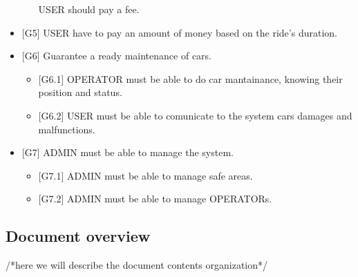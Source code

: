 \begin{itemize}
\begin{itemize}
USER should pay a fee.
\end{itemize}
\item {[}G5{]} USER have to pay an amount of money based on the ride's duration.
\item {[}G6{]} Guarantee a ready maintenance of cars.
\begin{itemize}
\item {[}G6.1{]} OPERATOR must be able to do car mantainance, knowing their
position and status.
\item {[}G6.2{]} USER must be able to comunicate to the system cars damages
and malfunctions. 
\end{itemize}
\item {[}G7{]} ADMIN must be able to manage the system.
\begin{itemize}
\item {[}G7.1{]} ADMIN must be able to manage safe areas.
\item {[}G7.2{]} ADMIN must be able to manage OPERATORs.
\end{itemize}
\end{itemize}

\subsection{Document overview}

/{*}here we will describe the document contents organization{*}/
